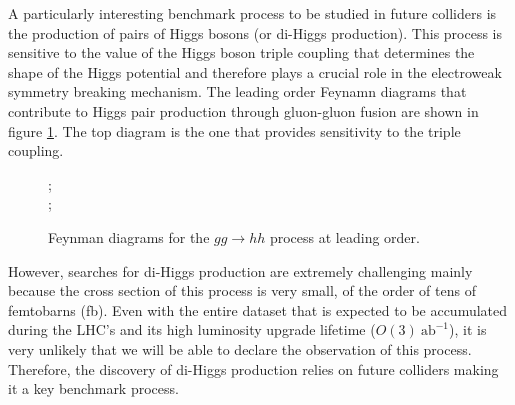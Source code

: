 A particularly interesting benchmark process to be studied in future colliders is the production of pairs of Higgs bosons (or di-Higgs production). This process is sensitive to the value of the Higgs boson triple coupling that determines the shape of the Higgs potential and therefore plays a crucial role in the electroweak symmetry breaking mechanism. The leading order Feynamn diagrams that contribute to Higgs pair production through gluon-gluon fusion are shown in figure \ref{fig:hh_diag}. The top diagram is the one that provides sensitivity to the triple coupling.

\begin{figure}[h]
	\centering
	;\\
	;
	\caption{Feynman diagrams for the $gg\rightarrow hh$ process at leading order.}
	\label{fig:hh_diag}
\end{figure}

However, searches for di-Higgs production are extremely challenging mainly because the cross section of this process is very small, of the order of tens of femtobarns (fb). Even with the entire dataset that is expected to be accumulated during the LHC's and its high luminosity upgrade lifetime ($O(3)~\text{ab}^{-1}$), it is very unlikely that we will be able to declare the observation of this process. Therefore, the discovery of di-Higgs production relies on future colliders making it a key benchmark process.

